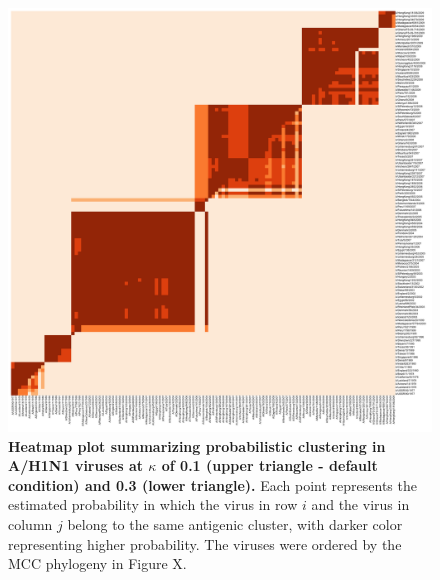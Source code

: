 \documentclass[11pt,oneside,letterpaper]{article}
\begin{document}
\begin{figure}[h]
	\centering		
	\includegraphics[width=1\textwidth]{figures/custom/H1N1mds01vs03ordered}
	\caption{\textbf{Heatmap plot summarizing probabilistic clustering in A/H1N1 viruses at $\kappa$ of 0.1 (upper triangle - default condition) and 0.3 (lower triangle).}
Each point represents the estimated probability  in which the virus in row $i$ and the virus in column $j$ belong to the same antigenic cluster, with darker color representing higher probability.  
The viruses were ordered by the MCC phylogeny in Figure X.
	 		} 
	\label{H1N1-heatmap} 
\end{figure}


\end{document}
